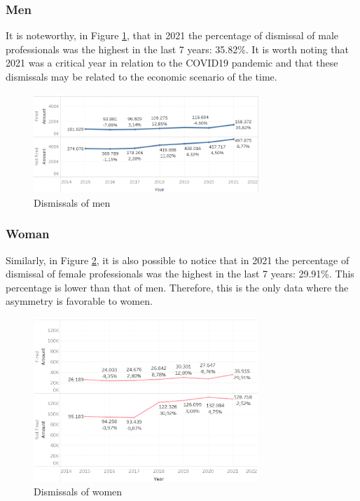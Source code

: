 \subsubsection{Men}

It is noteworthy, in Figure \ref{fig_4_qnt_h_demit}, that in 2021 the percentage of dismissal of male professionals was the highest in the last 7 years: 35.82\%. It is worth noting that 2021 was a critical year in relation to the COVID19 pandemic and that these dismissals may be related to the economic scenario of the time.

\begin{figure}[htbp]
	\centerline{
		\includegraphics[width=85mm]{assets/4_qnt_h_demit.PNG}
	}
	\caption{Dismissals of men}
	\label{fig_4_qnt_h_demit}
\end{figure}

\subsubsection{Woman}

Similarly, in Figure \ref{fig_4_qnt_m_demit}, it is also possible to notice that in 2021 the percentage of dismissal of female professionals was the highest in the last 7 years: 29.91\%. This percentage is lower than that of men. Therefore, this is the only data where the asymmetry is favorable to women.

\begin{figure}[htbp]
	\centerline{
		\includegraphics[width=85mm]{assets/4_qnt_m_demit.PNG}
	}
	\caption{Dismissals of women}
	\label{fig_4_qnt_m_demit}
\end{figure}

